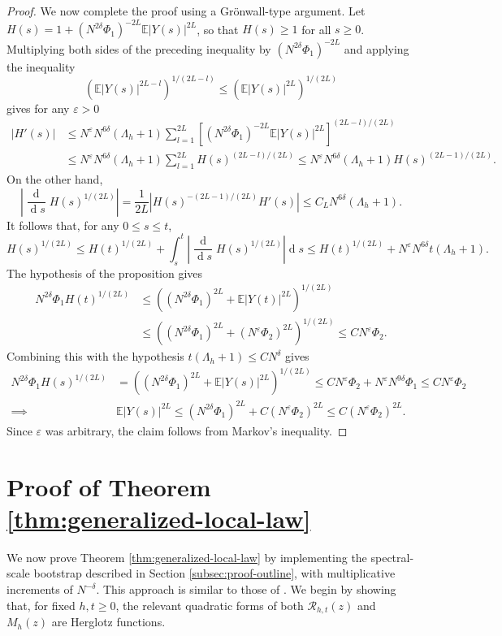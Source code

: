 \documentclass[11pt,reqno]{amsart}
\def\E{\mathbb{E}}
\def\cR{\mathcal{R}}
\def\de{\operatorname{d}}
\def\eps{\varepsilon}
\theoremstyle{definition}
\numberwithin{equation}{section}
\numberwithin{figure}{section}
\begin{document}
\begin{proof}
We now complete the proof using a Gr\"onwall-type argument. Let $H(s)=1+(N^{2\delta}\Phi_1)^{-2L}\E|Y(s)|^{2L}$, so that $H(s)\geq 1$ for all $s\ge 0$. Multiplying both sides of the preceding inequality by $(N^{2\delta}\Phi_1)^{-2L}$ and applying the inequality
\[
    (\E|Y(s)|^{2L-l})^{1/(2L-l)}\leq (\E|Y(s)|^{2L})^{1/(2L)}
\]
gives for any $\eps>0$
\begin{align*}
    |H'(s)|&\leq N^\eps N^{6\delta}(\Lambda_h+1)\sum_{l=1}^{2L}[(N^{2\delta}\Phi_1)^{-2L}\E|Y(s)|^{2L}]^{(2L-l)/(2L)}\\
    &\leq N^\eps N^{6\delta}(\Lambda_h+1)\sum_{l=1}^{2L}H(s)^{(2L-l)/(2L)}\leq N^\eps N^{6\delta}(\Lambda_h+1) H(s)^{(2L-1)/(2L)}.
\end{align*}
On the other hand,
\[
    \left|\frac{\de}{\de s}H(s)^{1/(2L)}\right|=\frac{1}{2L}|H(s)^{-(2L-1)/(2L)}H'(s)|\leq C_LN^{6\delta}(\Lambda_h+1).
\]
It follows that, for any $0\leq s\leq t$,
\[
    H(s)^{1/(2L)}\leq H(t)^{1/(2L)}+\int_{s}^t\left|\frac{\de}{\de s}H(s)^{1/(2L)}\right|\de s\leq H(t)^{1/(2L)}+N^\eps N^{6\delta}t(\Lambda_h+1).
\]
The hypothesis of the proposition gives
\begin{align*}
    N^{2\delta}\Phi_1H(t)^{1/(2L)}&\leq((N^{2\delta}\Phi_1)^{2L}+\E|Y(t)|^{2L})^{1/(2L)}\\
    &\leq ((N^{2\delta}\Phi_1)^{2L}+(N^{\eps}\Phi_2)^{2L})^{1/(2L)}\leq CN^{\eps}\Phi_2.
\end{align*}
Combining this with the hypothesis $t(\Lambda_h+1)\leq CN^\delta$ gives
\begin{align*}
    N^{2\delta}\Phi_1H(s)^{1/(2L)}&=((N^{2\delta}\Phi_1)^{2L}+\E|Y(s)|^{2L})^{1/(2L)}\leq CN^{\eps}\Phi_2 + N^\eps N^{9\delta}\Phi_1\leq CN^{\eps}\Phi_2\\
    \implies&\E|Y(s)|^{2L}\leq (N^{2\delta}\Phi_1)^{2L}+C(N^{\eps}\Phi_2)^{2L}\leq C(N^{\eps}\Phi_2)^{2L}.
\end{align*}
Since $\eps$ was arbitrary, the claim follows from Markov's inequality.
\end{proof}

\section{Proof of Theorem \ref{thm:generalized-local-law}}\label{sec:proof-main}

We now prove Theorem \ref{thm:generalized-local-law} by implementing the spectral-scale bootstrap described in Section \ref{subsec:proof-outline}, with multiplicative increments of $N^{-\delta}$. This approach is similar to those of \cite{fan2026anisotropic,knowles2017anisotropic}. We begin by showing that, for fixed $h,t\geq 0$, the relevant quadratic forms of both $\cR_{h,t}(z)$ and $M_h(z)$ are Herglotz functions.
\end{document}
